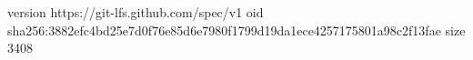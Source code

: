 version https://git-lfs.github.com/spec/v1
oid sha256:3882efc4bd25e7d0f76e85d6e7980f1799d19da1ece4257175801a98c2f13fae
size 3408
